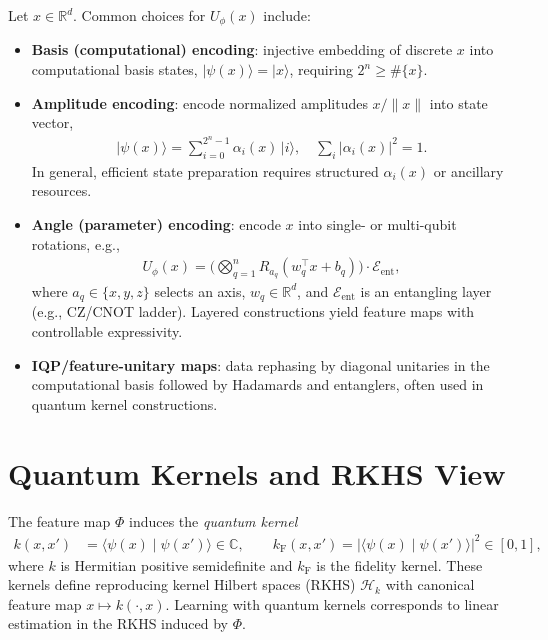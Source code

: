 \documentclass[11pt]{article}
\begin{document}
Let \(x\in\mathbb{R}^d\). Common choices for \(U_\phi(x)\) include:
\begin{itemize}
  \item \textbf{Basis (computational) encoding}: injective embedding of discrete \(x\) into computational basis states, \(\lvert \psi(x)\rangle = \lvert x\rangle\), requiring \(2^n\ge \#\{x\}\).
  \item \textbf{Amplitude encoding}: encode normalized amplitudes \(x/\lVert x\rVert\) into state vector,
  \begin{align}
    \lvert \psi(x) \rangle 
    = \sum_{i=0}^{2^n-1} \alpha_i(x)\, \lvert i \rangle,
    \quad \sum_i |\alpha_i(x)|^2 = 1.
  \end{align}
  In general, efficient state preparation requires structured \(\alpha_i(x)\) or ancillary resources.
  \item \textbf{Angle (parameter) encoding}: encode \(x\) into single- or multi-qubit rotations, e.g.,
  \begin{align}
    U_\phi(x) 
    = \Big( \bigotimes_{q=1}^n R_{a_q}(w_q^\top x + b_q) \Big) \cdot \mathcal{E}_{\text{ent}},
  \end{align}
  where \(a_q\in\{x,y,z\}\) selects an axis, \(w_q\in\mathbb{R}^d\), and \(\mathcal{E}_{\text{ent}}\) is an entangling layer (e.g., CZ/CNOT ladder). Layered constructions yield feature maps with controllable expressivity.
  \item \textbf{IQP/feature-unitary maps}: data rephasing by diagonal unitaries in the computational basis followed by Hadamards and entanglers, often used in quantum kernel constructions.
\end{itemize}

\section{Quantum Kernels and RKHS View}

The feature map \(\Phi\) induces the \emph{quantum kernel}
\begin{align}
  k(x,x') 
    &= \langle \psi(x) \mid \psi(x') \rangle \in \mathbb{C},
  \qquad k_\mathrm{F}(x,x') = |\langle \psi(x) \mid \psi(x') \rangle|^2 \in [0,1],\label{eq:kernel}
\end{align}
where \(k\) is Hermitian positive semidefinite and \(k_\mathrm{F}\) is the fidelity kernel. These kernels define reproducing kernel Hilbert spaces (RKHS) \(\mathcal{H}_k\) with canonical feature map \(x\mapsto k(\cdot,x)\). Learning with quantum kernels corresponds to linear estimation in the RKHS induced by \(\Phi\).
\end{document}

